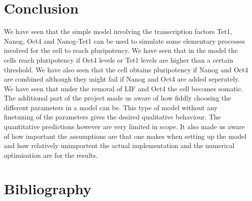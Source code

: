 \newpage
\section{Conclusion}
We have seen that the simple model involving the transcription factors Tet1, Nanog, Oct4 and Nanog-Tet1 can be used to simulate
some elementary processes involved for the cell to reach pluripotency. 
We have seen that in the model the cells reach pluripotency if Oct4 levels or Tet1 levels are higher than a certain threshold.
We have also seen that the cell obtains pluripotency if Nanog and Oct4 are combined although they might fail if Nanog and Oct4 are added seperately.
We have seen that under the removal of LIF and Oct4 the cell becomes somatic.
The additional part of the project made us aware of how fiddly choosing the different parameters in a model can be.
This type of model without any finetuning of the parameters gives the desired qualitative behaviour.
The quantitative predictions however are very limited in scope. It also made us aware of how important the assumptions are that one makes when setting
up the model and how relatively unimportent the actual implementation and the numerical optimisation are for the results.

\section*{Bibliography}
\nocite{*}
\printbibliography[heading=none, keyword={secondary}]



